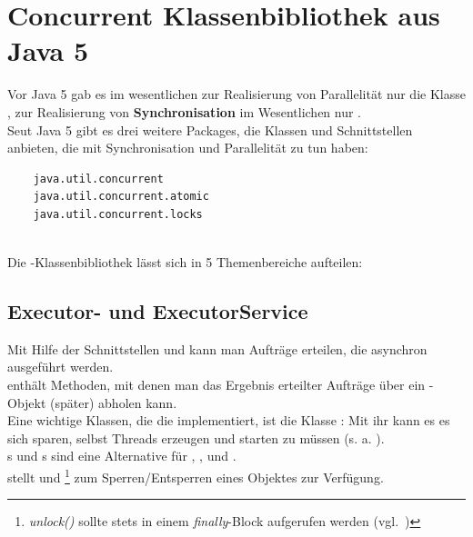 \section{Concurrent Klassenbibliothek aus Java 5}

Vor Java 5 gab es im wesentlichen zur Realisierung von Parallelität nur die Klasse , zur Realisierung von \textbf{Synchronisation} im Wesentlichen nur .\\

\noindent
Seut Java 5 gibt es drei weitere Packages, die Klassen und Schnittstellen anbieten, die mit Synchronisation und Parallelität zu tun haben:



\begin{verbatim}
    java.util.concurrent
    java.util.concurrent.atomic
    java.util.concurrent.locks
\end{verbatim}\\


Die -Klassenbibliothek lässt sich in 5 Themenbereiche aufteilen:

\subsection*{Executor- und ExecutorService}
Mit Hilfe der Schnittstellen  und  kann man Aufträge erteilen, die asynchron ausgeführt werden.\\

\noindent
{} enthält Methoden, mit denen man das Ergebnis erteilter Aufträge über ein -Objekt (später) abholen kann.\\

\noindent
Eine wichtige Klassen, die die  implementiert, ist die Klasse : Mit ihr kann es es sich sparen, selbst Threads erzeugen und starten zu müssen (s. a. \cite[146]{Oec22}).\\

\noindent
{}s und s sind eine Alternative für , , und .\\

\noindent
{} stellt  und \footnote{
    \textit{unlock()} sollte stets in einem \textit{finally}-Block aufgerufen werden (vgl.~\cite[150]{Oec22})
} zum Sperren/Entsperren eines Objektes zur Verfügung.

